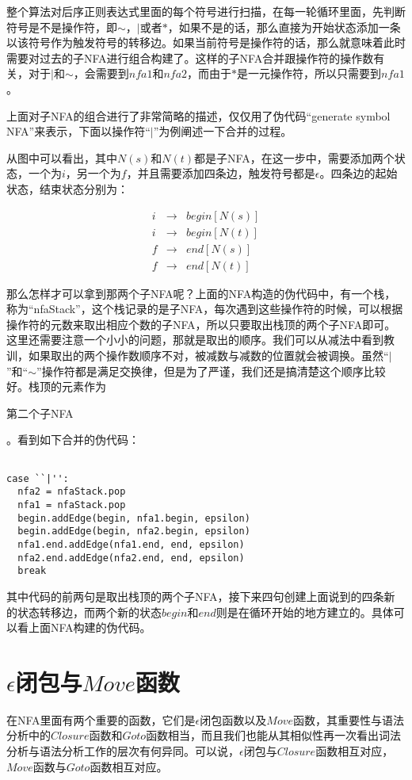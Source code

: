 整个算法对后序正则表达式里面的每个符号进行扫描，在每一轮循环里面，先判断符号是不是操作符，即$\sim$，$|$或者$*$，如果不是的话，那么直接为开始状态添加一条以该符号作为触发符号的转移边。如果当前符号是操作符的话，那么就意味着此时需要对过去的子NFA进行组合构建了。这样的子NFA合并跟操作符的操作数有关，对于$|$和$\sim$，会需要到$nfa1$和$nfa2$，而由于$*$是一元操作符，所以只需要到$nfa1$。

上面对子NFA的组合进行了非常简略的描述，仅仅用了伪代码“generate symbol NFA”来表示，下面以操作符“$|$”为例阐述一下合并的过程。



从图中可以看出，其中$N(s)$和$N(t)$都是子NFA，在这一步中，需要添加两个状态，一个为$i$，另一个为$f$，并且需要添加四条边，触发符号都是$\epsilon$。四条边的起始状态，结束状态分别为：

\begin{center}
\begin{eqnarray*}
     i & \rightarrow & begin[N(s)] \\
     i & \rightarrow & begin[N(t)] \\
     f & \rightarrow & end[N(s)] \\
     f & \rightarrow & end[N(t)] 
\end{eqnarray*}
\end{center}

\newpage

那么怎样才可以拿到那两个子NFA呢？上面的NFA构造的伪代码中，有一个栈，称为“nfaStack”，这个栈记录的是子NFA，每次遇到这些操作符的时候，可以根据操作符的元数来取出相应个数的子NFA，所以只要取出栈顶的两个子NFA即可。这里还需要注意一个小小的问题，那就是取出的顺序。我们可以从减法中看到教训，如果取出的两个操作数顺序不对，被减数与减数的位置就会被调换。虽然“$|$”和“$\sim$”操作符都是满足交换律，但是为了严谨，我们还是搞清楚这个顺序比较好。栈顶的元素作为\begin{bfseries}第二个子NFA\end{bfseries}。看到如下合并的伪代码：

\begin{verbatim}

case ``|'':
  nfa2 = nfaStack.pop
  nfa1 = nfaStack.pop
  begin.addEdge(begin, nfa1.begin, epsilon)
  begin.addEdge(begin, nfa2.begin, epsilon)
  nfa1.end.addEdge(nfa1.end, end, epsilon)
  nfa2.end.addEdge(nfa2.end, end, epsilon)
  break

\end{verbatim}

其中代码的前两句是取出栈顶的两个子NFA，接下来四句创建上面说到的四条新的状态转移边，而两个新的状态$begin$和$end$则是在循环开始的地方建立的。具体可以看上面NFA构建的伪代码。


\section{$\epsilon$闭包与$Move$函数}

在NFA里面有两个重要的函数，它们是$\epsilon$闭包函数以及$Move$函数，其重要性与语法分析中的$Closure$函数和$Goto$函数相当，而且我们也能从其相似性再一次看出词法分析与语法分析工作的层次有何异同。可以说，$\epsilon$闭包与$Closure$函数相互对应，$Move$函数与$Goto$函数相互对应。
